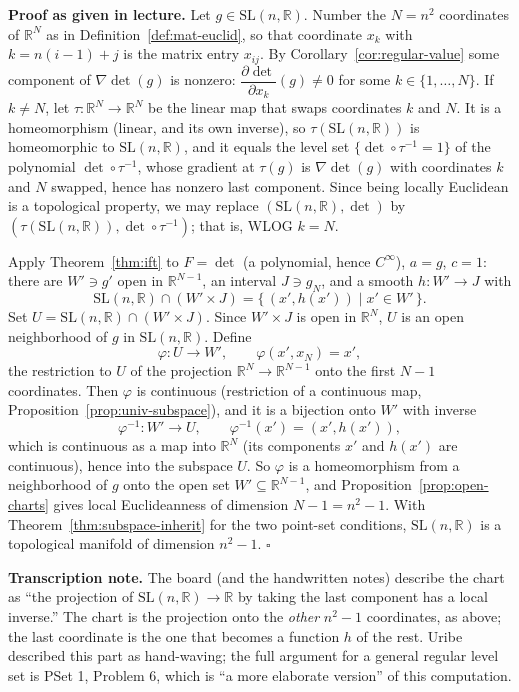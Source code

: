 \documentclass[11pt]{report}
\renewenvironment{proof}[1][Proof]{\noindent\textbf{#1.} }{\hfill$\square$\par\vspace{5pt}}
\newcommand{\SL}{\mathrm{SL}}
\begin{document}
\begin{proof}[Proof as given in lecture]
Let $g \in \SL(n,\mathbb{R})$. Number the $N = n^2$ coordinates of $\mathbb{R}^N$ as in Definition~\ref{def:mat-euclid}, so that coordinate $x_k$ with $k = n(i-1)+j$ is the matrix entry $x_{ij}$. By Corollary~\ref{cor:regular-value} some component of $\nabla\det(g)$ is nonzero: $\dfrac{\partial \det}{\partial x_k}(g) \neq 0$ for some $k \in \{1, \ldots, N\}$. If $k \neq N$, let $\tau : \mathbb{R}^N \to \mathbb{R}^N$ be the linear map that swaps coordinates $k$ and $N$. It is a homeomorphism (linear, and its own inverse), so $\tau(\SL(n,\mathbb{R}))$ is homeomorphic to $\SL(n,\mathbb{R})$, and it equals the level set $\{\det \circ \tau^{-1} = 1\}$ of the polynomial $\det \circ \tau^{-1}$, whose gradient at $\tau(g)$ is $\nabla\det(g)$ with coordinates $k$ and $N$ swapped, hence has nonzero last component. Since being locally Euclidean is a topological property, we may replace $(\SL(n,\mathbb{R}), \det)$ by $(\tau(\SL(n,\mathbb{R})), \det \circ \tau^{-1})$; that is, WLOG $k = N$.

Apply Theorem~\ref{thm:ift} to $F = \det$ (a polynomial, hence $C^\infty$), $a = g$, $c = 1$: there are $W' \ni g'$ open in $\mathbb{R}^{N-1}$, an interval $J \ni g_N$, and a smooth $h : W' \to J$ with
\[
\SL(n,\mathbb{R}) \cap (W' \times J) = \{\, (x', h(x')) \mid x' \in W' \,\}.
\]
Set $U = \SL(n,\mathbb{R}) \cap (W' \times J)$. Since $W' \times J$ is open in $\mathbb{R}^N$, $U$ is an open neighborhood of $g$ in $\SL(n,\mathbb{R})$. Define
\[
\varphi : U \to W', \qquad \varphi(x', x_N) = x' ,
\]
the restriction to $U$ of the projection $\mathbb{R}^N \to \mathbb{R}^{N-1}$ onto the first $N-1$ coordinates. Then $\varphi$ is continuous (restriction of a continuous map, Proposition~\ref{prop:univ-subspace}), and it is a bijection onto $W'$ with inverse
\[
\varphi^{-1} : W' \to U, \qquad \varphi^{-1}(x') = (x', h(x')),
\]
which is continuous as a map into $\mathbb{R}^N$ (its components $x'$ and $h(x')$ are continuous), hence into the subspace $U$. So $\varphi$ is a homeomorphism from a neighborhood of $g$ onto the open set $W' \subseteq \mathbb{R}^{N-1}$, and Proposition~\ref{prop:open-charts} gives local Euclideanness of dimension $N - 1 = n^2 - 1$. With Theorem~\ref{thm:subspace-inherit} for the two point-set conditions, $\SL(n,\mathbb{R})$ is a topological manifold of dimension $n^2-1$.
\end{proof}

\textbf{Transcription note.} The board (and the handwritten notes) describe the chart as ``the projection of $\SL(n,\mathbb{R}) \to \mathbb{R}$ by taking the last component has a local inverse.'' The chart is the projection onto the \emph{other} $n^2 - 1$ coordinates, as above; the last coordinate is the one that becomes a function $h$ of the rest. Uribe described this part as hand-waving; the full argument for a general regular level set is PSet 1, Problem 6, which is ``a more elaborate version'' of this computation.
\end{document}
